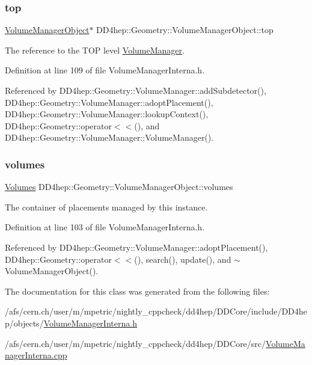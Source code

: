 \subsubsection{\texorpdfstring{top}{top}}
{\footnotesize\ttfamily \hyperlink{class_d_d4hep_1_1_geometry_1_1_volume_manager_object}{Volume\+Manager\+Object}$\ast$ D\+D4hep\+::\+Geometry\+::\+Volume\+Manager\+Object\+::top}



The reference to the T\+OP level \hyperlink{class_d_d4hep_1_1_geometry_1_1_volume_manager}{Volume\+Manager}. 



Definition at line 109 of file Volume\+Manager\+Interna.\+h.



Referenced by D\+D4hep\+::\+Geometry\+::\+Volume\+Manager\+::add\+Subdetector(), D\+D4hep\+::\+Geometry\+::\+Volume\+Manager\+::adopt\+Placement(), D\+D4hep\+::\+Geometry\+::\+Volume\+Manager\+::lookup\+Context(), D\+D4hep\+::\+Geometry\+::operator$<$$<$(), and D\+D4hep\+::\+Geometry\+::\+Volume\+Manager\+::\+Volume\+Manager().

\hypertarget{class_d_d4hep_1_1_geometry_1_1_volume_manager_object_a7ba195782a138b7e47a66389c5845ae6}{}\label{class_d_d4hep_1_1_geometry_1_1_volume_manager_object_a7ba195782a138b7e47a66389c5845ae6} 
\subsubsection{\texorpdfstring{volumes}{volumes}}
{\footnotesize\ttfamily \hyperlink{class_d_d4hep_1_1_geometry_1_1_volume_manager_object_a6bbeb958237bc33c7228abada088f6a1}{Volumes} D\+D4hep\+::\+Geometry\+::\+Volume\+Manager\+Object\+::volumes}



The container of placements managed by this instance. 



Definition at line 103 of file Volume\+Manager\+Interna.\+h.



Referenced by D\+D4hep\+::\+Geometry\+::\+Volume\+Manager\+::adopt\+Placement(), D\+D4hep\+::\+Geometry\+::operator$<$$<$(), search(), update(), and $\sim$\+Volume\+Manager\+Object().



The documentation for this class was generated from the following files\+:\begin{DoxyCompactItemize}
\item 
/afs/cern.\+ch/user/m/mpetric/nightly\+\_\+cppcheck/dd4hep/\+D\+D\+Core/include/\+D\+D4hep/objects/\hyperlink{_volume_manager_interna_8h}{Volume\+Manager\+Interna.\+h}\item 
/afs/cern.\+ch/user/m/mpetric/nightly\+\_\+cppcheck/dd4hep/\+D\+D\+Core/src/\hyperlink{_volume_manager_interna_8cpp}{Volume\+Manager\+Interna.\+cpp}\end{DoxyCompactItemize}
